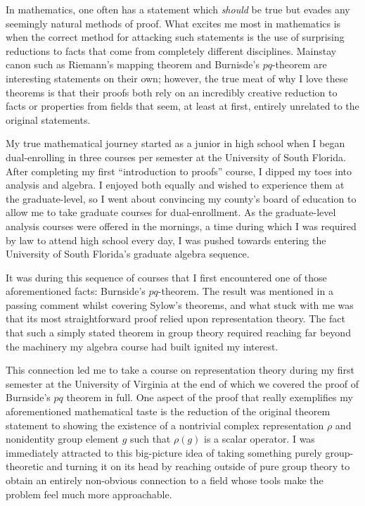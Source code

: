 \documentclass[11pt]{article}
\begin{document}
In mathematics, one often has a statement which \emph{should} be true but evades any seemingly natural methods of proof. What excites me most in mathematics is when the correct method for attacking such statements is the use of surprising reductions to facts that come from completely different disciplines. Mainstay canon such as Riemann's mapping theorem and Burnisde's $pq$-theorem are interesting statements on their own; however, the true meat of why I love these theorems is that their proofs both rely on an incredibly creative reduction to facts or properties from fields that seem, at least at first, entirely unrelated to the original statements.

My true mathematical journey started as a junior in high school when I began dual-enrolling in three courses per semester at the University of South Florida. After completing my first ``introduction to proofs'' course, I dipped my toes into analysis and algebra. I enjoyed both equally and wished to experience them at the graduate-level, so I went about convincing my county's board of education to allow me to take graduate courses for dual-enrollment. As the graduate-level analysis courses were offered in the mornings, a time during which I was required by law to attend high school every day, I was pushed towards entering the University of South Florida's graduate algebra sequence.

It was during this sequence of courses that I first encountered one of those aforementioned facts: Burnside's $pq$-theorem. The result was mentioned in a passing comment whilst covering Sylow's theorems, and what stuck with me was that its most straightforward proof relied upon representation theory. The fact that such a simply stated theorem in group theory required reaching far beyond the machinery my algebra course had built ignited my interest.

This connection led me to take a course on representation theory during my first semester at the University of Virginia at the end of which we covered the proof of Burnside's $pq$ theorem in full. One aspect of the proof that really exemplifies my aforementioned mathematical taste is the reduction of the original theorem statement to showing the existence of a nontrivial complex representation $\rho$ and nonidentity group element $g$ such that $\rho(g)$ is a scalar operator. I was immediately attracted to this big-picture idea of taking something purely group-theoretic and turning it on its head by reaching outside of pure group theory to obtain an entirely non-obvious connection to a field whose tools make the problem feel much more approachable.
\end{document}
